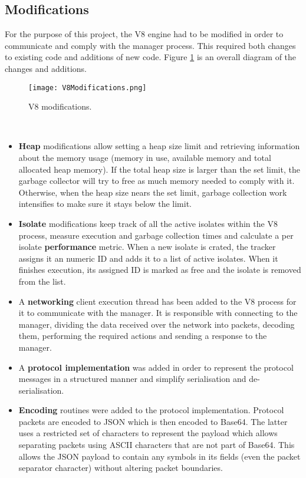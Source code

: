 \documentclass{l4proj}
\begin{document}
\subsection{Modifications}
\hspace*{3em} For the purpose of this project, the V8 engine had to be modified in order to communicate and comply with the manager process. This required both changes to existing code and additions of new code. Figure \ref{v8changes} is an overall diagram of the changes and additions.
\begin{figure}[!ht]
  \centering
    \texttt{[image: V8Modifications.png]}
  \caption{V8 modifications.}
    \label{v8changes}
\end{figure}\\
\begin{itemize}
\item \textbf{Heap} modifications allow setting a heap size limit and retrieving information about the memory usage (memory in use, available memory and total allocated heap memory). If the total heap size is larger than the set limit, the garbage collector will try to free as much memory needed to comply with it. Otherwise, when the heap size nears the set limit, garbage collection work intensifies to make sure it stays below the limit.
\item \textbf{Isolate} modifications keep track of all the active isolates within the V8 process, measure execution and garbage collection times and calculate a per isolate \textbf{performance} metric. When a new isolate is crated, the tracker assigns it an numeric ID and adds it to a list of active isolates. When it finishes execution, its assigned ID is marked as free and the isolate is removed from the list.
\item A \textbf{networking} client execution thread has been added to the V8 process for it to communicate with the manager. It is responsible with connecting to the manager, dividing the data received over the network into packets, decoding them, performing the required actions and sending a response to the manager.
\item A \textbf{protocol implementation} was added in order to represent the protocol messages in a structured manner and simplify serialisation and de-serialisation.

\item \textbf{Encoding} routines were added to the protocol implementation. Protocol packets are encoded to JSON which is then encoded to Base64. The latter uses a restricted set of characters to represent the payload which allows separating packets using ASCII characters that are not part of Base64. This allows the JSON payload to contain any symbols in its fields (even the packet separator character) without altering packet boundaries.


\end{itemize}
\end{document}
